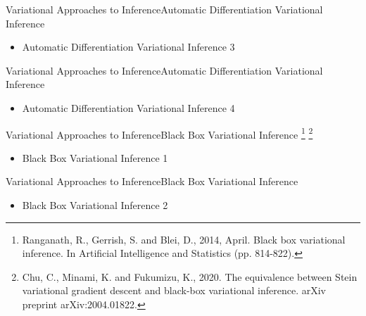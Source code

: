 \documentclass[AERbeamer%
              ,optEnglish%
              ,optBiber%
              ,optBibstyleAlphabetic%
              ,optBeamerClassicFormat%
              ]{AERlatex}%
\begin{document}
\begin{frame}[c]{Variational Approaches to Inference}{Automatic Differentiation Variational Inference}
    \centering
    \begin{itemize}
        \item Automatic Differentiation Variational Inference 3
    \end{itemize}
\end{frame}


\begin{frame}[c]{Variational Approaches to Inference}{Automatic Differentiation Variational Inference}
    \centering
    \begin{itemize}
        \item Automatic Differentiation Variational Inference 4
    \end{itemize}
\end{frame}



\begin{frame}[c]{Variational Approaches to Inference}{Black Box Variational Inference \footnote{Ranganath, R., Gerrish, S. and Blei, D., 2014, April. Black box
                                                                                                variational inference. In Artificial Intelligence and Statistics (pp. 814-822).}
                                                                                      \footnote{Chu, C., Minami, K. and Fukumizu, K., 2020. The equivalence between Stein
                                                                                                variational gradient descent and black-box variational inference. arXiv preprint arXiv:2004.01822.}}
    \centering
    \begin{itemize}
        \item Black Box Variational Inference 1
    \end{itemize}
\end{frame}


\begin{frame}[c]{Variational Approaches to Inference}{Black Box Variational Inference}
    \centering
    \begin{itemize}
        \item Black Box Variational Inference 2
    \end{itemize}
\end{frame}
\end{document}
